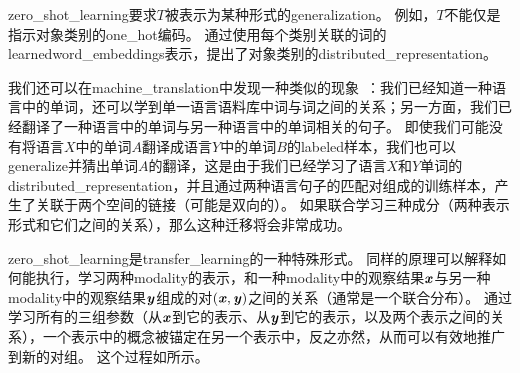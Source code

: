 \gls{zero_shot_learning}要求$T$被表示为某种形式的\gls{generalization}。
例如，$T$不能仅是指示对象类别的\gls{one_hot}编码。
通过使用每个类别关联的词的\gls{learned}\gls{word_embeddings}表示，\cite{Socher-2013}提出了对象类别的\gls{distributed_representation}。


我们还可以在\gls{machine_translation}中发现一种类似的现象~\citep{Klementiev-et-al-COLING2012,Mikolov-et-al-arxiv2013,Gouws-et-al-arxiv2014}：我们已经知道一种语言中的单词，还可以学到单一语言语料库中词与词之间的关系；另一方面，我们已经翻译了一种语言中的单词与另一种语言中的单词相关的句子。
即使我们可能没有将语言$X$中的单词$A$翻译成语言$Y$中的单词$B$的\gls{labeled}样本，我们也可以\gls{generalize}并猜出单词$A$的翻译，这是由于我们已经学习了语言$X$和$Y$单词的\gls{distributed_representation}，并且通过两种语言句子的匹配对组成的训练样本，产生了关联于两个空间的链接（可能是双向的）。
如果联合学习三种成分（两种表示形式和它们之间的关系），那么这种迁移将会非常成功。

\gls{zero_shot_learning}是\gls{transfer_learning}的一种特殊形式。
同样的原理可以解释如何能执行，学习两种\gls{modality}的表示，和一种\gls{modality}中的观察结果$\boldsymbol{\mathit{x}}$与另一种\gls{modality}中的观察结果$\boldsymbol{\mathit{y}}$组成的对$(\boldsymbol{\mathit{x}}, \boldsymbol{\mathit{y}})$之间的关系（通常是一个联合分布）\citep{Srivastava+Salakhutdinov-NIPS2012-small}。
通过学习所有的三组参数（从$\boldsymbol{\mathit{x}}$到它的表示、从$\boldsymbol{\mathit{y}}$到它的表示，以及两个表示之间的关系），一个表示中的概念被锚定在另一个表示中，反之亦然，从而可以有效地推广到新的对组。 %
这个过程如所示。

